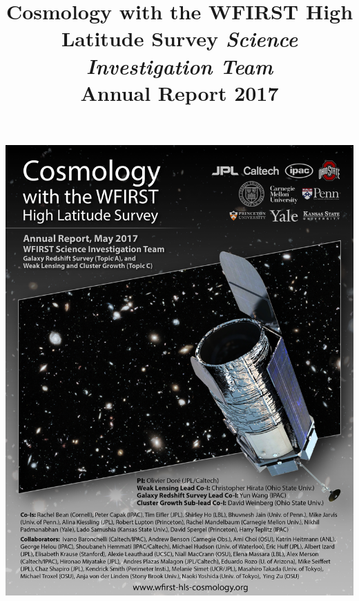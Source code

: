 \documentclass[letter]{ar-1col_WFIRST-HLS}
\begin{document}

\vspace*{-2.25cm}
\hspace*{-0.5cm}
\thispagestyle{empty}
\includegraphics[width=1.35\textwidth,height=1.225\textheight]{Plots/WFIRSTProposalCover_AnnualReport2017.jpg}
%

\cleardoublepage


\title{Cosmology with the WFIRST High Latitude Survey \emph{Science Investigation Team}\\ Annual Report 2017}


\end{document}
